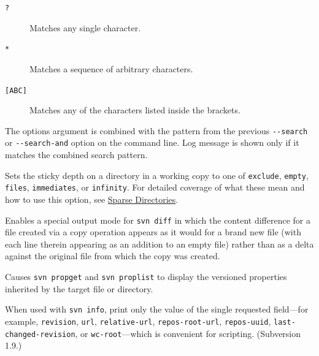 \begin{description}
\begin{description}
\item[\texttt{?}]
Matches any single character.
\item[\texttt{*}]
Matches a sequence of arbitrary characters.
\item[\texttt{{[}ABC{]}}]
Matches any of the characters listed inside the brackets.
\end{description}
\item[\protect\phantomsection\label{svn.ref.svn.sw.search_and}{}\texttt{-\/-search-and}
\textless ARG\textgreater{}]
The option\textquotesingle s argument is combined with the pattern from
the previous \texttt{-\/-search} or \texttt{-\/-search-and} option on
the command line. Log message is shown only if it matches the combined
search pattern.
\item[\protect\phantomsection\label{svn.ref.svn.sw.set_depth}{}\texttt{-\/-set-depth}
\textless ARG\textgreater{}]
Sets the sticky depth on a directory in a working copy to one of
\texttt{exclude}, \texttt{empty}, \texttt{files}, \texttt{immediates},
or \texttt{infinity}. For detailed coverage of what these mean and how
to use this option, see \hyperref[svn.advanced.sparsedirs]{Sparse
Directories}.
\item[\protect\phantomsection\label{svn.ref.svn.sw.show_copies_as_adds}{}\texttt{-\/-show-copies-as-adds}]
Enables a special output mode for \texttt{svn\ diff} in which the
content difference for a file created via a copy operation appears as it
would for a brand new file (with each line therein appearing as an
addition to an empty file) rather than as a delta against the original
file from which the copy was created.
\item[\protect\phantomsection\label{svn.ref.svn.sw.show_inherited_props}{}\texttt{-\/-show-inherited-props}]
Causes \texttt{svn\ propget} and \texttt{svn\ proplist} to display the
versioned properties inherited by the target file or directory.
\item[\protect\phantomsection\label{svn.ref.svn.sw.show_item}{}\texttt{-\/-show-item}
\textless ARG\textgreater{}]
When used with \texttt{svn\ info}, print only the value of the single
requested field---for example, \texttt{revision}, \texttt{url},
\texttt{relative-url}, \texttt{repos-root-url}, \texttt{repos-uuid},
\texttt{last-changed-revision}, or \texttt{wc-root}---which is convenient
for scripting. (Subversion 1.9.)
\item[\protect\phantomsection\label{svn.ref.svn.sw.show_revs}{}\texttt{-\/-show-revs}
\textless ARG\textgreater{}]

\end{description}
